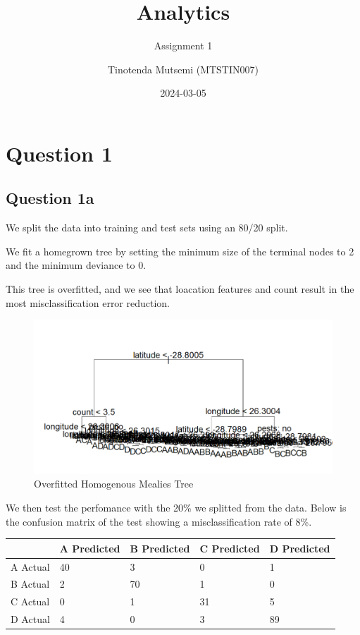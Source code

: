 \documentclass[
]{article}
\title{Analytics}
\subtitle{Assignment 1}
\author{Tinotenda Mutsemi (MTSTIN007)}
\date{2024-03-05}
\begin{document}
\maketitle

\hypertarget{question-1}{%
\section{Question 1}\label{question-1}}

\hypertarget{question-1a}{%
\subsection{Question 1a}\label{question-1a}}

We split the data into training and test sets using an 80/20 split.

We fit a homegrown tree by setting the minimum size of the terminal
nodes to 2 and the minimum deviance to 0.

This tree is overfitted, and we see that loacation features and count
result in the most misclassification error reduction.

\begin{figure}
\centering
\includegraphics[width=4.51042in,height=\textheight]{big_tree_mealies.png}
\caption{Overfitted Homogenous Mealies Tree}
\end{figure}

We then test the perfomance with the 20\% we splitted from the data.
Below is the confusion matrix of the test showing a misclassification
rate of 8\%.

\begin{longtable}[]{@{}lllll@{}}
\toprule\noalign{}
& A Predicted & B Predicted & C Predicted & D Predicted \\
\midrule\noalign{}
\endhead
\bottomrule\noalign{}
\endlastfoot
A Actual & 40 & 3 & 0 & 1 \\
B Actual & 2 & 70 & 1 & 0 \\
C Actual & 0 & 1 & 31 & 5 \\
D Actual & 4 & 0 & 3 & 89 \\
\end{longtable}
\end{document}
